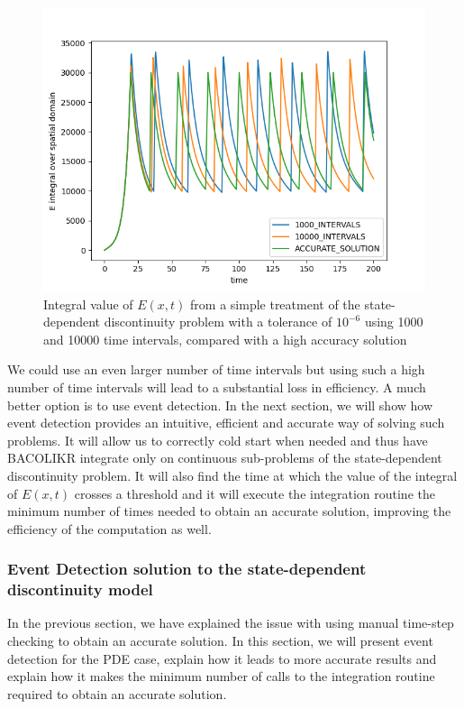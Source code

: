 \documentclass{article}
\begin{document}
\begin{figure}[H]
\centering
\includegraphics[width=0.7\linewidth]{./figures/pde_state_disc_naive_1000vs10000}
\caption{Integral value of $E(x, t)$ from a simple treatment of the state-dependent discontinuity problem with a tolerance of $10^{-6}$ using 1000 and 10000 time intervals, compared with a high accuracy solution}
\label{fig:pde_state_disc_naive_1000vs10000}
\end{figure}

We could use an even larger number of time intervals but using such a high number of time intervals will lead to a substantial loss in efficiency. A much better option is to use event detection. In the next section, we will show how event detection provides an intuitive, efficient and accurate way of solving such problems. It will allow us to correctly cold start when needed and thus have BACOLIKR integrate only on continuous sub-problems of the state-dependent discontinuity problem. It will also find the time at which the value of the integral of $E(x, t)$ crosses a threshold and it will execute the integration routine the minimum number of times needed to obtain an accurate solution, improving the efficiency of the computation as well.

\subsubsection{Event Detection solution to the state-dependent discontinuity model}
\label{subsubsection:pde_state_event_detection}
In the previous section, we have explained the issue with using manual time-step checking to obtain an accurate solution. In this section, we will present event detection for the PDE case, explain how it leads to more accurate results and explain how it makes the minimum number of calls to the integration routine required to obtain an accurate solution.
\end{document}
